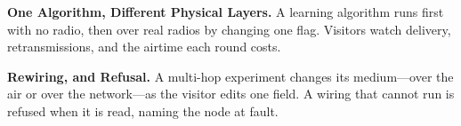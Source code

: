 \documentclass[sigconf,10pt]{acmart}
\begin{document}
\textbf{One Algorithm, Different Physical Layers.} A learning algorithm runs
first with no radio, then over real radios by changing one flag. Visitors
watch delivery, retransmissions, and the airtime each round costs.

\textbf{Rewiring, and Refusal.} A multi-hop experiment changes its
medium---over the air or over the network---as the visitor edits one field. A
wiring that cannot run is refused when it is read, naming the node at fault.

{\small


}
\end{document}
